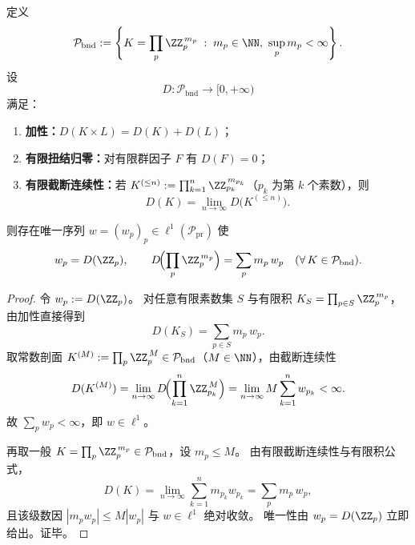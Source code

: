 \begin{theorem}\label{thm:conclusion-additive-scalar-procircle-l1-classification}
定义
\[
\mathcal P_{\mathrm{bnd}}
:=\left\{K=\prod_{p}\ZZ_p^{\,m_p}\;:\;m_p\in\NN,\ \sup_p m_p<\infty\right\}.
\]
设
\[
D:\mathcal P_{\mathrm{bnd}}\to[0,+\infty)
\]
满足：
\begin{enumerate}
  \item \textbf{加性：}\(D(K\times L)=D(K)+D(L)\)；
  \item \textbf{有限扭结归零：}对有限群因子 \(F\) 有 \(D(F)=0\)；
  \item \textbf{有限截断连续性：}若 \(K^{(\le n)}:=\prod_{k=1}^{n}\ZZ_{p_k}^{\,m_{p_k}}\)（\(p_k\) 为第 \(k\) 个素数），则
  \[
  D(K)=\lim_{n\to\infty}D\!\bigl(K^{(\le n)}\bigr).
  \]
\end{enumerate}
则存在唯一序列 \(w=(w_p)_{p}\in\ell^1(\mathcal P_{\mathrm{pr}})\) 使
\[
w_p=D(\ZZ_p),\qquad
D\!\Bigl(\prod_p\ZZ_p^{\,m_p}\Bigr)=\sum_{p}m_p\,w_p
\quad(\forall\,K\in\mathcal P_{\mathrm{bnd}}).
\]
\end{theorem}
\begin{proof}
令 \(w_p:=D(\ZZ_p)\)。
对任意有限素数集 \(S\) 与有限积
\(
K_S=\prod_{p\in S}\ZZ_p^{\,m_p}
\)，由加性直接得到
\[
D(K_S)=\sum_{p\in S}m_p\,w_p.
\]
取常数剖面 \(K^{(M)}:=\prod_p\ZZ_p^{\,M}\in\mathcal P_{\mathrm{bnd}}\)（\(M\in\NN\)），由截断连续性
\[
D(K^{(M)})
=\lim_{n\to\infty}D\!\Bigl(\prod_{k=1}^{n}\ZZ_{p_k}^{\,M}\Bigr)
=\lim_{n\to\infty}M\sum_{k=1}^{n}w_{p_k}
<\infty.
\]
故 \(\sum_p w_p<\infty\)，即 \(w\in\ell^1\)。

再取一般 \(K=\prod_p\ZZ_p^{\,m_p}\in\mathcal P_{\mathrm{bnd}}\)，设 \(m_p\le M\)。
由有限截断连续性与有限积公式，
\[
D(K)
=\lim_{n\to\infty}\sum_{k=1}^{n}m_{p_k}w_{p_k}
=\sum_{p}m_p\,w_p,
\]
且该级数因 \(|m_p w_p|\le M|w_p|\) 与 \(w\in\ell^1\) 绝对收敛。
唯一性由 \(w_p=D(\ZZ_p)\) 立即给出。证毕。
\end{proof}

